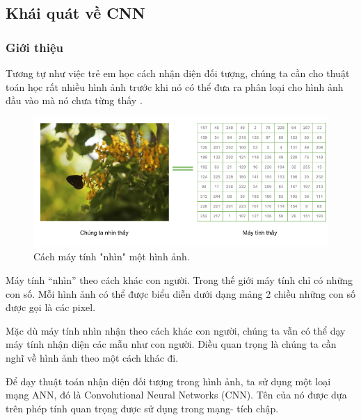 \setcounter{chapter}{0}
\setcounter{section}{0}
\begin{center}
\chapter{\tenchuongi}
\end{center}

\section{Khái quát về CNN}
\subsection{Giới thiệu}
Tương tự như việc trẻ em học cách nhận diện đối tượng, chúng ta cần cho thuật toán học rất nhiều hình ảnh trước khi nó có thể đưa ra phân loại cho hình ảnh đầu vào mà nó chưa từng thấy \cite{ntt}.

\begin{figure}[H]
	\centering
	\includegraphics[width=1\linewidth]{images/how_computer_see_image}
	\caption[Cách máy tính "nhìn" một hình.]{Cách máy tính "nhìn" một hình ảnh.}
\end{figure}

Máy tính “nhìn” theo cách khác con người. Trong thế giới máy tính chỉ có những con số. Mỗi hình ảnh có thể được biểu diễn dưới dạng mảng 2 chiều những con số được gọi là các pixel.

Mặc dù máy tính nhìn nhận theo cách khác con người, chúng ta vẫn có thể dạy máy tính nhận diện các mẫu như con người. Điều quan trọng là chúng ta cần nghĩ về hình ảnh theo một cách khác đi.

Để dạy thuật toán nhận diện đối tượng trong hình ảnh, ta sử dụng một loại mạng ANN, đó là Convolutional Neural Networks (CNN). Tên của nó được dựa trên phép tính quan trọng được sử dụng trong mạng- tích chập.

